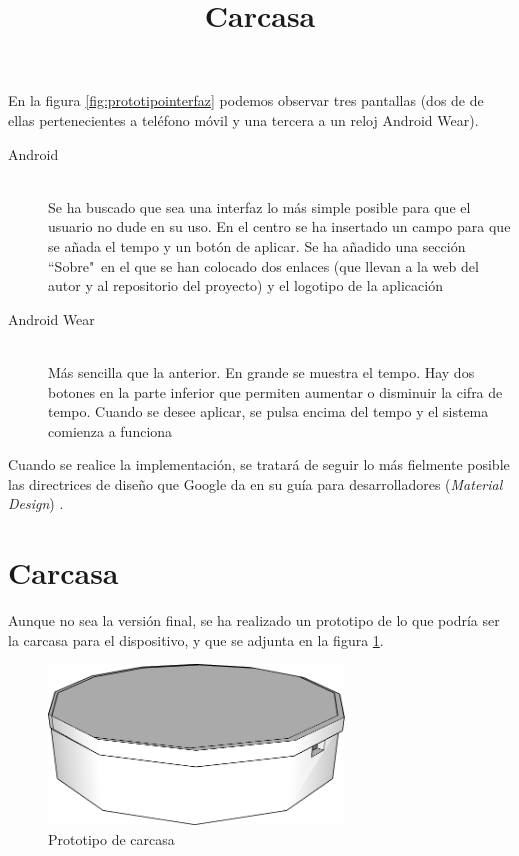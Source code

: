 En la figura \ref{fig:prototipointerfaz} podemos observar tres pantallas (dos de de ellas
pertenecientes a teléfono móvil y una tercera a un reloj Android Wear).

\begin{description}
  \item[Android] \hfill \\
    Se ha buscado que sea una interfaz lo más simple posible para que el usuario no dude
    en su uso. En el centro se ha insertado un campo para que se añada el tempo y un botón de aplicar.
    Se ha añadido una sección ``Sobre"\ en el que se han colocado dos enlaces (que
    llevan a la web del autor y al repositorio del proyecto) y el logotipo de la aplicación
  \item[Android Wear] \hfill \\
    Más sencilla que la anterior. En grande se muestra el tempo. Hay dos botones en la parte inferior que permiten
    aumentar o disminuir la cifra de tempo. Cuando se desee aplicar, se pulsa encima del tempo y el sistema
    comienza a funciona
\end{description}

Cuando se realice la implementación, se tratará de seguir lo más fielmente posible las directrices de diseño que
Google da en su guía para desarrolladores (\textit{Material Design}) \cite{googlematerial}.\\

\section{Carcasa}
\title{Carcasa}
Aunque no sea la versión final, se ha realizado un prototipo de lo que podría ser la carcasa para el dispositivo,
y que se adjunta en la figura \ref{fig:prototipocase}. \\

\begin{figure}[htb]
\centering
\includegraphics[width=0.7\textwidth]{./imagenes/prototipo}
\caption{Prototipo de carcasa} \label{fig:prototipocase}
\end{figure}
